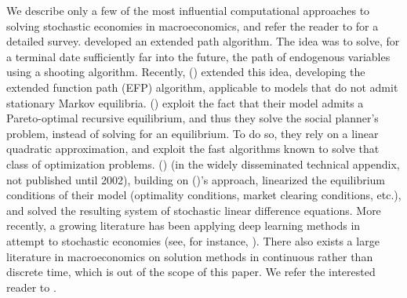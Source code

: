 We describe only a few of the most influential computational approaches to solving stochastic economies in macroeconomics, and refer the reader to \citet{fernandez1016solve} for a detailed survey.
\citeauthor{durbin2012time} \citeyear{durbin2012time} developed an extended path algorithm.
The idea was to solve, for a terminal date sufficiently far into the future, the path of endogenous variables using a shooting algorithm. 
Recently, \citeauthor{maliar2015tractable} (\citeyear{maliar2015tractable}) extended this idea, developing the extended function path (EFP) algorithm, applicable to models that do not admit stationary Markov equilibria.
\citeauthor{kydland1982time} (\citeyear{kydland1982time}) exploit the fact that their model admits a Pareto-optimal recursive equilibrium, and thus they solve the social planner's problem, instead of solving for an equilibrium.
To do so, they rely on a linear quadratic approximation, and exploit the fast algorithms known to solve that class of optimization problems. 
\citeauthor{king2002production} (\citeyear{king2002production}) (in the widely disseminated technical appendix, not published until 2002), building on \citeauthor{blanchard1980solution} (\citeyear{blanchard1980solution})'s approach, linearized the equilibrium conditions of their model (optimality conditions, market clearing conditions, etc.), and solved the resulting system of stochastic linear difference equations.
More recently, a growing literature has been applying deep learning methods in attempt to stochastic economies (see, for instance, \citet{curry2023learning, han2021deepham, childers2022differentiable}).
%
There also exists a large literature in macroeconomics on solution methods in continuous rather than discrete time, which is out of the scope of this paper.
We refer the interested reader to \citet{parra2015solution}.
